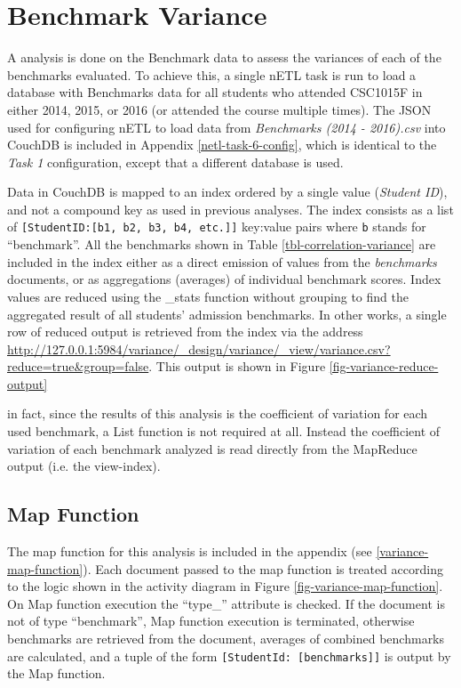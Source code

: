 \section{Benchmark Variance}
A  analysis is done on the Benchmark data to assess the variances of each of the benchmarks evaluated. To achieve this, a single nETL task is run to load a database with Benchmarks data for all students who attended CSC1015F in either 2014, 2015, or 2016 (or attended the course multiple times). The JSON used for configuring nETL to load data from \textit{Benchmarks (2014 - 2016).csv} into CouchDB is included in Appendix \ref{netl-task-6-config}, which is identical to the \textit{Task 1} configuration, except that a different database is used.

Data in CouchDB is mapped to an index ordered by a single value (\textit{Student ID}), and not a compound key as used in previous analyses. The index consists as a list of \texttt{[StudentID:[b1, b2, b3, b4, etc.]]} key:value pairs where \texttt{b} stands for ``benchmark''. All the benchmarks shown in Table \ref{tbl-correlation-variance} are included in the index either as a direct emission of values from the \textit{benchmarks} documents, or as aggregations (averages) of individual benchmark scores. Index values are reduced using the \_stats function without grouping to find the aggregated result of all students' admission benchmarks. In other works, a single row of reduced output is retrieved from the index via the address \url{http://127.0.0.1:5984/variance/_design/variance/_view/variance.csv?reduce=true&group=false}. This output is shown in Figure \ref{fig-variance-reduce-output}



in fact, since the results of this analysis is the coefficient of variation for each used benchmark, a List function is not required at all. Instead the coefficient of variation of each benchmark analyzed is read directly from the MapReduce output (i.e. the view-index).

\subsection{Map Function}
The map function for this analysis is included in the appendix (see \ref{variance-map-function}). Each document passed to the map function is treated according to the logic shown in the activity diagram in Figure \ref{fig-variance-map-function}. On Map function execution the ``type\_'' attribute is checked. If the document is not of type ``benchmark'', Map function execution is terminated, otherwise benchmarks are retrieved from the document, averages of combined benchmarks are calculated, and a tuple of the form \texttt{[StudentId: [benchmarks]]} is output by the Map function.

